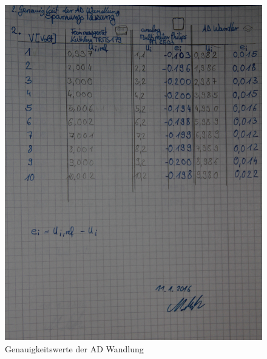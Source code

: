 \documentclass[12pt,oneside,a4paper]{report}
\begin{document}
\begin{figure}[H]
\centering\small
\includegraphics[width=\textwidth]{src/2GenauigkeitsWerteAD.jpg}
\caption{Genauigkeitswerte der AD Wandlung}
\label{fig:AD_WERTE}
\end{figure}
\end{document}
